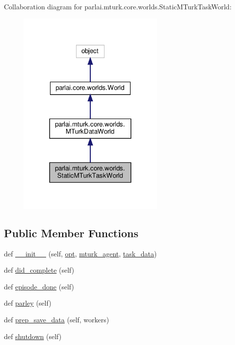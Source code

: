 Collaboration diagram for parlai.\+mturk.\+core.\+worlds.\+Static\+M\+Turk\+Task\+World\+:
\nopagebreak
\begin{figure}[H]
\begin{center}
\leavevmode
\includegraphics[width=204pt]{d9/d85/classparlai_1_1mturk_1_1core_1_1worlds_1_1StaticMTurkTaskWorld__coll__graph}
\end{center}
\end{figure}
\subsection*{Public Member Functions}
\begin{DoxyCompactItemize}
\item 
def \hyperlink{classparlai_1_1mturk_1_1core_1_1worlds_1_1StaticMTurkTaskWorld_a6bf4b23fee7509456b074b9587043d17}{\+\_\+\+\_\+init\+\_\+\+\_\+} (self, \hyperlink{classparlai_1_1core_1_1worlds_1_1World_a3640d92718acd3e6942a28c1ab3678bd}{opt}, \hyperlink{classparlai_1_1mturk_1_1core_1_1worlds_1_1StaticMTurkTaskWorld_a25d8cc71893b0b67169cba15f142b1bc}{mturk\+\_\+agent}, \hyperlink{classparlai_1_1mturk_1_1core_1_1worlds_1_1StaticMTurkTaskWorld_ad8f9036d50f5787b4872609a17c267e0}{task\+\_\+data})
\item 
def \hyperlink{classparlai_1_1mturk_1_1core_1_1worlds_1_1StaticMTurkTaskWorld_a2711944f83104bc843ff81293674c6ab}{did\+\_\+complete} (self)
\item 
def \hyperlink{classparlai_1_1mturk_1_1core_1_1worlds_1_1StaticMTurkTaskWorld_a07853455a3ffdc3d7142331c1d74649c}{episode\+\_\+done} (self)
\item 
def \hyperlink{classparlai_1_1mturk_1_1core_1_1worlds_1_1StaticMTurkTaskWorld_a83e09ea1d4ae320941d72b7c72897d3b}{parley} (self)
\item 
def \hyperlink{classparlai_1_1mturk_1_1core_1_1worlds_1_1StaticMTurkTaskWorld_a38d3d55c327426feb97d42c42c5cb49e}{prep\+\_\+save\+\_\+data} (self, workers)
\item 
def \hyperlink{classparlai_1_1mturk_1_1core_1_1worlds_1_1StaticMTurkTaskWorld_a793ecd56172f7bfd540b6d92887fb3f9}{shutdown} (self)
\end{DoxyCompactItemize}
